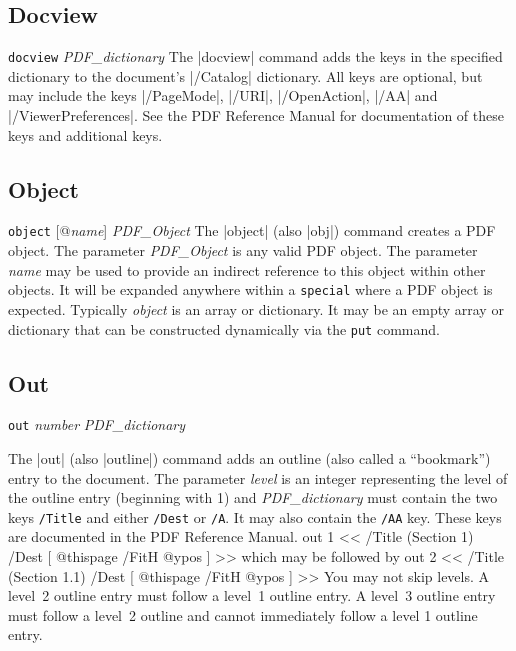 {\subsection{Docview}
\syntax
{\tt docview} {\it PDF\_dictionary}
\description
The |docview| command adds the keys in the specified dictionary to the
document's |/Catalog| dictionary.  All keys are optional, but may include
the keys |/PageMode|,
|/URI|, |/OpenAction|, |/AA|
and |/ViewerPreferences|.  See the PDF Reference Manual
for documentation of these keys and additional keys.
\example
\begintt
{}
\endtt


\subsection{Object}
\syntax
{\tt object} [@{\it name}] {\it PDF\_Object}
\description
The |object| (also |obj|) command creates a
PDF object.  The parameter {\it PDF\_Object} is any valid PDF object.  The
parameter {\it name} may be used to provide an indirect reference
to this object within other
objects. It will be expanded anywhere within
a {\tt special} where a PDF object is
expected. Typically {\it object} is an array
or dictionary.  It may be an empty array or
dictionary that can be constructed dynamically via
the {\tt put} command.
\example
\begintt
{}
\endtt

\subsection{Out}
\syntax
{\tt out} {\it number} {\it PDF\_dictionary}

\description
The |out| (also |outline|) command adds an outline (also called a ``bookmark'') entry
to the document.
The parameter {\it level\/} is an integer representing the
level of the outline entry (beginning with 1) and
{\it  PDF\_dictionary\/} must contain
the two keys {\tt /Title} and either {\tt /Dest} or {\tt /A}.
It may also contain the {\tt /AA} key.  These keys are documented
in the PDF Reference Manual.
\example
\begintt
out 1 << /Title (Section 1) /Dest [ @thispage /FitH @ypos ] >>
\endtt
which may be followed by
\begintt
out 2 << /Title (Section 1.1) /Dest [ @thispage /FitH @ypos ] >>
\endtt
\note
You may not skip levels.  A level~2 outline entry
must follow a level~1 outline
entry.  A level~3 outline entry must follow a level~2 outline
and cannot immediately follow a level 1 outline entry.

}
